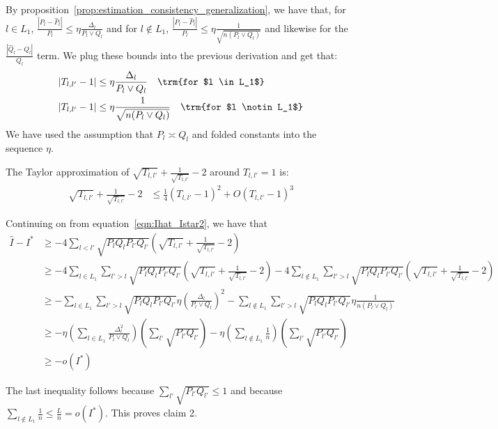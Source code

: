 \documentclass{article}
\begin{document}
By proposition~\ref{prop:estimation_consistency_generalization}, we have that, for $l \in L_1$, $\frac{|P_l - \hat{P}_l|}{P_l} \leq \eta \frac{\Delta_l}{P_l \vee Q_l}$ and for $l \notin L_1$, $\frac{|P_l - \hat{P}_l|}{P_l} \leq \eta \frac{1}{\sqrt{n (P_l \vee Q_l)}}$ and likewise for the $\frac{|\hat{Q}_l - Q_l|}{Q_l}$ term. We plug these bounds into the previous derivation and get that:
\begin{align*}
|T_{l,l'} - 1|  &\leq \eta  \frac{\Delta_l}{P_l \vee Q_l}  \quad \trm{for $l \in L_1$}\\
|T_{l,l'} - 1 | &\leq \eta \frac{1}{\sqrt{ n (P_l \vee Q_l)}} \quad \trm{for $l \notin L_1$}
\end{align*}
We have used the assumption that $P_l \asymp Q_l$ and folded constants into the sequence $\eta$. 


The Taylor approximation of $\sqrt{T_{l,l'}} + \frac{1}{\sqrt{T_{l,l'}}} - 2$ around $T_{l,l'}=1$ is:
\begin{align*}
\sqrt{T_{l,l'}} + \frac{1}{\sqrt{T_{l,l'}}} -2  &\leq 
  \frac{1}{4} (T_{l,l'} - 1)^2 + O (T_{l,l'}-1)^3 
\end{align*}

Continuing on from equation~\ref{eqn:Ihat_Istar2}, we have that
\begin{align*}
\hat{I} - I^* &\geq - 4 \sum_{l < l'} \sqrt{P_l Q_l P_{l'} Q_{l'}} 
    \left( \sqrt{T_{l,l'}} + \frac{1}{\sqrt{T_{l,l'}}} - 2 \right) \\
&\geq - 4 \sum_{l \in L_1} \sum_{l' > l} \sqrt{P_l Q_l P_{l'} Q_{l'}} 
    \left( \sqrt{T_{l,l'}} + \frac{1}{\sqrt{T_{l,l'}}} - 2 \right) 
     - 4 \sum_{l \notin L_1} \sum_{l' > l} \sqrt{P_l Q_l P_{l'} Q_{l'}} 
    \left( \sqrt{T_{l,l'}} + \frac{1}{\sqrt{T_{l,l'}}} - 2 \right) \\
  &\geq - \sum_{l \in L_1} \sum_{l' > l} \sqrt{P_l Q_l P_{l'} Q_{l'}} 
             \eta \left( \frac{\Delta_l}{P_l \vee Q_l}  \right)^2 
        - \sum_{l \notin L_1} \sum_{l' > l} \sqrt{P_l Q_l P_{l'} Q_{l'}} 
             \eta \frac{1}{n (P_l \vee Q_l)} \\
 &\geq - \eta \left( \sum_{l \in L_1} \frac{\Delta_l^2}{P_l \vee Q_l} \right)
         \left( \sum_{l'}  \sqrt{P_{l'}Q_{l'}} \right) 
       - \eta \left( \sum_{l \notin L_1} \frac{1}{n} \right) 
          \left( \sum_{l'} \sqrt{P_{l'} Q_{l'} } \right) \\
 &\geq - o(I^*)
\end{align*}

The last inequality follows because $\sum_{l'} \sqrt{P_{l'} Q_{l'}} \leq 1$ and because $\sum_{l \notin L_1} \frac{1}{n} \leq \frac{L}{n} = o(I^*)$. This proves claim 2.
\end{document}
